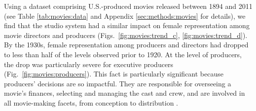 Using a dataset \cite{Moreira2017} comprising \totalMovies{} U.S.-produced movies released between 1894 and 2011 (see Table \ref{tab:movies:data} and Appendix \ref{sec:methods:movies} for details), we find that the studio system had a similar impact on female representation among movie directors and producers (Figs.~\ref{fig:movies:trend_c}, \ref{fig:movies:trend_d}). By the 1930s, female representation among producers and directors had dropped to less than half of the levels observed prior to 1920. At the level of producers, the drop was particularly severe for executive producers (Fig.~\ref{fig:movies:producers}). This fact is particularly significant because producers' decisions are so impactful. They are responsible for overseeing a movie's finances, selecting and managing the cast and crew, and are involved in all movie-making facets, from conception to distribution \cite{Lauzen1999,Cattani2013}.

